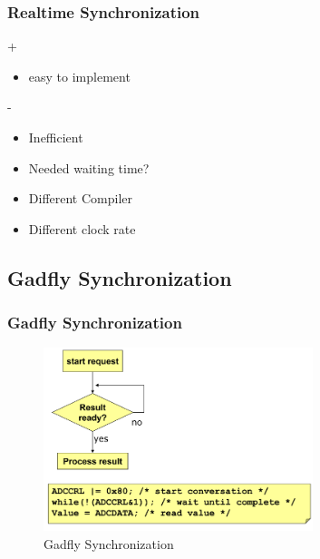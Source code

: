 \begin{frame}
    \frametitle{Realtime Synchronization}
        \begin{exampleblock}{+}
        \begin{itemize}
			\item easy to implement         
    	\end{itemize}
    \end{exampleblock}
    \begin{alertblock}{-}
        \begin{itemize}
			\item Inefficient        
        	\item Needed waiting time?
        	\item Different Compiler
        	\item Different clock rate
    	\end{itemize}
    \end{alertblock}
\end{frame}

\subsection{Gadfly Synchronization}
\begin{frame}
    \frametitle{Gadfly Synchronization}
    \begin{figure}
        \includegraphics[width=0.7\textwidth]{fig/gadfly.png}
        \caption{Gadfly Synchronization}
    \end{figure}
        
\end{frame}

